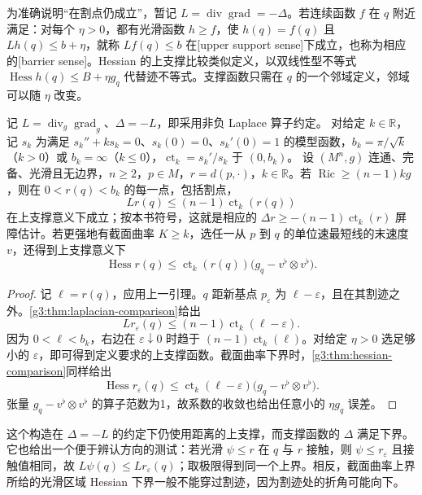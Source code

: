 为准确说明“在割点仍成立”，暂记 \(L=\operatorname{div}\operatorname{grad}=-\Delta\)。若连续函数 \(f\) 在 \(q\) 附近满足：对每个 \(\eta>0\)，都有光滑函数 \(h\ge f\)，使 \(h(q)=f(q)\) 且 \(Lh(q)\le b+\eta\)，就称 \(Lf(q)\le b\) 在[upper support sense]下成立，也称为相应的[barrier sense]。Hessian 的上支撑比较类似定义，以双线性型不等式 \(\operatorname{Hess}h(q)\le B+\eta g_q\) 代替迹不等式。支撑函数只需在 \(q\) 的一个邻域定义，邻域可以随 \(\eta\) 改变。

\begin{theorem}\label{g3:thm:distance-barrier-comparison}
	记 \(L=\operatorname{div}_g\operatorname{grad}_g\)、\(\Delta=-L\)，即采用非负 Laplace 算子约定。
	对给定 \(k\in\mathbb R\)，记 \(s_k\) 为满足 \(s_k''+ks_k=0\)、\(s_k(0)=0\)、\(s_k'(0)=1\) 的模型函数，\(b_k=\pi/\sqrt k\)（\(k>0\)）或 \(b_k=\infty\)（\(k\le0\)），\(\operatorname{ct}_k=s_k'/s_k\) 于 \((0,b_k)\)。
	设 \((M^n,g)\) 连通、完备、光滑且无边界，\(n\ge2\)，\(p\in M\)，\(r=d(p,\cdot)\)，\(k\in\mathbb R\)。若 \(\operatorname{Ric}\ge(n-1)kg\)，则在 \(0<r(q)<b_k\) 的每一点，包括割点，
	\[
		Lr(q)\le(n-1)\operatorname{ct}_k(r(q))
	\]
	在上支撑意义下成立；按本书符号，这就是相应的 \(\Delta r\ge-(n-1)\operatorname{ct}_k(r)\) 屏障估计。若更强地有截面曲率 \(K\ge k\)，选任一从 \(p\) 到 \(q\) 的单位速最短线的末速度 \(v\)，还得到上支撑意义下
	\[
		\operatorname{Hess}r(q)\le\operatorname{ct}_k(r(q))
		\bigl(g_q-v^\flat\otimes v^\flat\bigr).
	\]
\end{theorem}
\begin{proof}
	记 \(\ell=r(q)\)，应用上一引理。\(q\) 距新基点 \(p_\varepsilon\) 为 \(\ell-\varepsilon\)，且在其割迹之外。\cref{g3:thm:laplacian-comparison}给出
	\[
		Lr_\varepsilon(q)\le(n-1)\operatorname{ct}_k(\ell-\varepsilon).
	\]
	因为 \(0<\ell<b_k\)，右边在 \(\varepsilon\downarrow0\) 时趋于 \((n-1)\operatorname{ct}_k(\ell)\)。对给定 \(\eta>0\) 选足够小的 \(\varepsilon\)，即可得到定义要求的上支撑函数。截面曲率下界时，\cref{g3:thm:hessian-comparison}同样给出
	\[
		\operatorname{Hess}r_\varepsilon(q)
		\le\operatorname{ct}_k(\ell-\varepsilon)
		\bigl(g_q-v^\flat\otimes v^\flat\bigr).
	\]
	张量 \(g_q-v^\flat\otimes v^\flat\) 的算子范数为1，故系数的收敛也给出任意小的 \(\eta g_q\) 误差。
\end{proof}

这个构造在 \(\Delta=-L\) 的约定下仍使用距离的上支撑，而支撑函数的 \(\Delta\) 满足下界。它也给出一个便于辨认方向的测试：若光滑 \(\psi\le r\) 在 \(q\) 与 \(r\) 接触，则 \(\psi\le r_\varepsilon\) 且接触值相同，故 \(L\psi(q)\le Lr_\varepsilon(q)\)；取极限得到同一个上界。相反，截面曲率上界所给的光滑区域 Hessian 下界一般不能穿过割迹，因为割迹处的折角可能向下。

